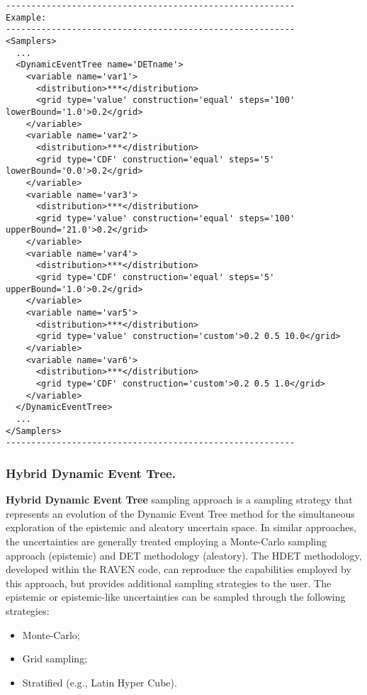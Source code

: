 \begin{lstlisting}[style=XML]
---------------------------------------------------------
Example:
---------------------------------------------------------
<Samplers>
  ...
  <DynamicEventTree name='DETname'> 
    <variable name='var1'> 
      <distribution>***</distribution>
      <grid	type='value' construction='equal' steps='100' lowerBound='1.0'>0.2</grid>	
    </variable> 
    <variable name='var2'> 
      <distribution>***</distribution>
      <grid	type='CDF' construction='equal' steps='5' lowerBound='0.0'>0.2</grid>	
    </variable>
    <variable name='var3'> 
      <distribution>***</distribution>
      <grid	type='value' construction='equal' steps='100' upperBound='21.0'>0.2</grid>	
    </variable> 
    <variable name='var4'> 
      <distribution>***</distribution>
      <grid	type='CDF' construction='equal' steps='5' upperBound='1.0'>0.2</grid>	
    </variable>
    <variable name='var5'> 
      <distribution>***</distribution>
      <grid	type='value' construction='custom'>0.2 0.5 10.0</grid>	
    </variable> 
    <variable name='var6'> 
      <distribution>***</distribution>
      <grid	type='CDF' construction='custom'>0.2 0.5 1.0</grid>	
    </variable>
  </DynamicEventTree>
  ...
</Samplers>
---------------------------------------------------------
\end{lstlisting}

\subsubsection{Hybrid Dynamic Event Tree.}
\label{subsubsubsec:HDET}
\textbf{Hybrid Dynamic Event Tree} sampling approach is a sampling strategy that represents an evolution of the Dynamic Event Tree method for the simultaneous exploration of the epistemic and aleatory uncertain space. 
In similar approaches,  the uncertainties are generally treated employing a Monte-Carlo sampling approach (epistemic) and DET methodology (aleatory).  The HDET methodology, developed within the RAVEN code, can reproduce the capabilities employed by this approach, but provides additional sampling strategies to the user. The epistemic or epistemic-like uncertainties can be sampled through the following strategies:
\begin{itemize}
\item Monte-Carlo; 
\item Grid sampling;
\item Stratified (e.g., Latin Hyper Cube).
\end{itemize}

